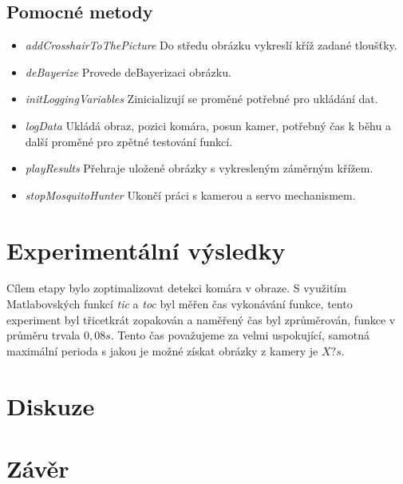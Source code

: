 \documentclass[a4paper,10pt]{article}
\begin{document}

\subsection{Pomocné metody}

		\begin{itemize}
				\item \textit{addCrosshairToThePicture} Do středu obrázku vykreslí kříž zadané tloušťky. 
				\item \textit{deBayerize} Provede deBayerizaci obrázku.
				\item \textit{initLoggingVariables} Zinicializují se proměné potřebné pro ukládání dat.
				\item \textit{logData} Ukládá obraz, pozici komára, posun kamer, potřebný čas k běhu a další proměné pro zpětné testování funkcí.
				\item \textit{playResults} Přehraje uložené obrázky s vykresleným záměrným křížem.
				\item \textit{stopMosquitoHunter} Ukončí práci s kamerou a servo mechanismem.
		\end{itemize}

\section{Experimentální výsledky}
		Cílem etapy bylo zoptimalizovat detekci komára v obraze. 
		S využitím Matlabovských funkcí \textit{tic} a \textit{toc} byl měřen čas vykonávání funkce, 
		tento experiment byl třicetkrát zopakován a naměřený čas byl zprůměrován, funkce v průměru trvala $0,08 s$. 
		Tento čas považujeme za velmi uspokující, samotná maximální perioda s jakou je možné získat obrázky z kamery je $X? s$. 




\section{Diskuze}
\section{Závěr}



\end{document}
